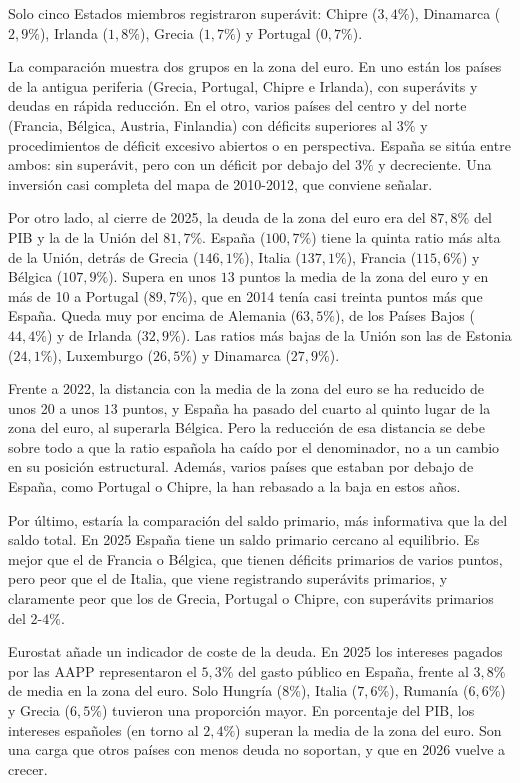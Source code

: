 \documentclass[10pt,a4paper]{article}
\begin{document}
Solo cinco Estados miembros registraron superávit: Chipre ($3,4\%$), Dinamarca ($2,9\%$), Irlanda ($1,8\%$), Grecia ($1,7\%$) y Portugal ($0,7\%$).

La comparación muestra dos grupos en la zona del euro. En uno están los países de la antigua periferia (Grecia, Portugal, Chipre e Irlanda), con superávits y deudas en rápida reducción. En el otro, varios países del centro y del norte (Francia, Bélgica, Austria, Finlandia) con déficits superiores al $3\%$ y procedimientos de déficit excesivo abiertos o en perspectiva. España se sitúa entre ambos: sin superávit, pero con un déficit por debajo del $3\%$ y decreciente. Una inversión casi completa del mapa de 2010-2012, que conviene señalar.

Por otro lado, al cierre de 2025, la deuda de la zona del euro era del $87,8\%$ del PIB y la de la Unión del $81,7\%$. España ($100,7\%$) tiene la quinta ratio más alta de la Unión, detrás de Grecia ($146,1\%$), Italia ($137,1\%$), Francia ($115,6\%$) y Bélgica ($107,9\%$). Supera en unos $13$ puntos la media de la zona del euro y en más de 10 a Portugal ($89,7\%$), que en 2014 tenía casi treinta puntos más que España. Queda muy por encima de Alemania ($63,5\%$), de los Países Bajos ($44,4\%$) y de Irlanda ($32,9\%$). Las ratios más bajas de la Unión son las de Estonia ($24,1\%$), Luxemburgo ($26,5\%$) y Dinamarca ($27,9\%$).

Frente a 2022, la distancia con la media de la zona del euro se ha reducido de unos 20 a unos $13$ puntos, y España ha pasado del cuarto al quinto lugar de la zona del euro, al superarla Bélgica. Pero la reducción de esa distancia se debe sobre todo a que la ratio española ha caído por el denominador, no a un cambio en su posición estructural. Además, varios países que estaban por debajo de España, como Portugal o Chipre, la han rebasado a la baja en estos años.

Por último, estaría la comparación del saldo primario, más informativa que la del saldo total. En 2025 España tiene un saldo primario cercano al equilibrio. Es mejor que el de Francia o Bélgica, que tienen déficits primarios de varios puntos, pero peor que el de Italia, que viene registrando superávits primarios, y claramente peor que los de Grecia, Portugal o Chipre, con superávits primarios del $2$-$4\%$. 

Eurostat añade un indicador de coste de la deuda. En 2025 los intereses pagados por las AAPP representaron el $5,3\%$ del gasto público en España, frente al $3,8\%$ de media en la zona del euro. Solo Hungría ($8\%$), Italia ($7,6\%$), Rumanía ($6,6\%$) y Grecia ($6,5\%$) tuvieron una proporción mayor. En porcentaje del PIB, los intereses españoles (en torno al $2,4\%$) superan la media de la zona del euro. Son una carga que otros países con menos deuda no soportan, y que en 2026 vuelve a crecer.
\end{document}
